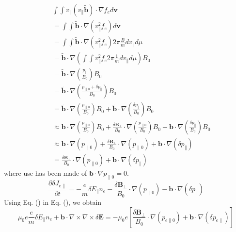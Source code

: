 \documentclass{llncs}
\begin{document}
\begin{eqnarray}
  &  & \int \int v_{\parallel} (v_{\parallel} \tilde{\mathbf{b}}) \cdot
  \nabla f_e d\mathbf{v} \nonumber\\
  &  & = \int \int \tilde{\mathbf{b}} \cdot \nabla (v_{\parallel}^2 f_e)
  d\mathbf{v} \nonumber\\
  &  & = \int \int \tilde{\mathbf{b}} \cdot \nabla (v_{\parallel}^2 f_e) 2
  \pi \frac{B}{m} d v_{\parallel} d \mu \nonumber\\
  &  & = \tilde{\mathbf{b}} \cdot \nabla \left( \int \int v_{\parallel}^2 f_e
  2 \pi \frac{1}{m} d v_{\parallel} d \mu \right) B_0 \nonumber\\
  &  & = \tilde{\mathbf{b}} \cdot \nabla \left( \frac{p_{\parallel}}{B_0}
  \right) B_0 \nonumber\\
  &  & = \tilde{\mathbf{b}} \cdot \nabla \left( \frac{p_{\parallel 0} +
  \delta p_{\parallel}}{B_0} \right) B_0 \nonumber\\
  &  & = \tilde{\mathbf{b}} \cdot \nabla \left( \frac{p_{\parallel 0}}{B_0}
  \right) B_0 + \tilde{\mathbf{b}} \cdot \nabla \left( \frac{\delta
  p_{\parallel}}{B_0} \right) B_0 \nonumber\\
  &  & \approx \mathbf{b} \cdot \nabla \left( \frac{p_{\parallel 0}}{B_0}
  \right) B_0 + \frac{\delta \mathbf{B}_{\perp}}{B_0} \cdot \nabla \left(
  \frac{p_{\parallel 0}}{B_0} \right) B_0 +\mathbf{b} \cdot \nabla \left(
  \frac{\delta p_{\parallel}}{B_0} \right) B_0 \nonumber\\
  &  & \approx \mathbf{b} \cdot \nabla (p_{\parallel 0}) + \frac{\delta
  \mathbf{B}_{\perp}}{B_0} \cdot \nabla (p_{\parallel 0}) +\mathbf{b} \cdot
  \nabla (\delta p_{\parallel}) \\
  &  & = \frac{\delta \mathbf{B}_{\perp}}{B_0} \cdot \nabla (p_{\parallel 0})
  +\mathbf{b} \cdot \nabla (\delta p_{\parallel}) \nonumber
\end{eqnarray}
where use has been made of $\mathbf{b} \cdot \nabla p_{\parallel 0} = 0$.
\begin{equation}
  \frac{\partial \delta J_{e \parallel}}{\partial t} = - \frac{e}{m} \delta
  E_{\parallel} n_e - \frac{\delta \mathbf{B}_{\perp}}{B_0} \cdot \nabla
  (p_{\parallel 0}) -\mathbf{b} \cdot \nabla (\delta p_{\parallel})
\end{equation}
Using Eq. () in Eq. (), we obtain
\begin{equation}
  \mu_0 e \frac{e}{m} \delta E_{\parallel} n_e +\mathbf{b} \cdot \nabla \times
  \nabla \times \delta \mathbf{E}= - \mu_0 e \left[ \frac{\delta
  \mathbf{B}_{\perp}}{B_0} \cdot \nabla (p_{e \parallel 0}) +\mathbf{b} \cdot
  \nabla (\delta p_{e \parallel}) \right]
\end{equation}
\end{document}
